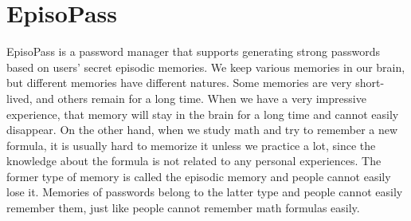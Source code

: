 \documentclass[runningheads,a4paper]{llncs}
\begin{document}
\section{EpisoPass}

EpisoPass is a password manager that supports generating
strong passwords based on users' secret episodic memories.
%
%
We keep various memories in our brain, but different memories have different natures.
Some memories are very short-lived, and others remain for a long time.
When we have a very impressive experience,
that memory will stay in the brain for a long time and
cannot easily disappear.
On the other hand, when we study math and try to remember a new formula,
it is usually hard to memorize it unless we practice a lot,
since the knowledge about the formula is not related to
any personal experiences.
The former type of memory is called the episodic memory and
people cannot easily lose it.
Memories of passwords belong to the latter type and
people cannot easily remember them, just like people cannot
remember math formulas easily.

% 
\end{document}
